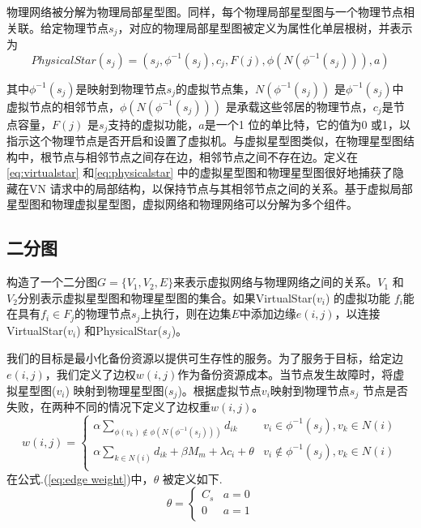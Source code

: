 物理网络被分解为物理局部星型图。同样，每个物理局部星型图与一个物理节点相关联。给定物理节点$s_j$，对应的物理局部星型图被定义为属性化单层根树，并表示为
\begin{equation}
PhysicalStar(s_j)=(s_j, \phi^{-1}( s_j), c_j, F(j), \phi(N(\phi^{-1}( s_j))), a)
\label{eq:physicalstar}
\end{equation}

其中$\phi^{-1}( s_j)$是映射到物理节点$s_j$的虚拟节点集，$N(\phi^{-1}( s_j))$ 是$\phi^{-1}( s_j)$中虚拟节点的相邻节点，$\phi(N(\phi^{-1}( s_j)))$ 是承载这些邻居的物理节点，$c_j$是节点容量，$F(j)$ 是$s_j$支持的虚拟功能，$a$是一个1 位的单比特，它的值为0 或1，以指示这个物理节点是否开启和设置了虚拟机。与虚拟星型图类似，在物理星型图结构中，根节点与相邻节点之间存在边，相邻节点之间不存在边。定义在\ref{eq:virtualstar} 和\ref{eq:physicalstar} 中的虚拟星型图和物理星型图很好地捕获了隐藏在VN 请求中的局部结构，以保持节点与其相邻节点之间的关系。基于虚拟局部星型图和物理虚拟星型图，虚拟网络和物理网络可以分解为多个组件。

\subsection{二分图}
构造了一个二分图$G=\{V_1,V_2,E\}$来表示虚拟网络与物理网络之间的关系。$V_1$ 和$V_2$分别表示虚拟星型图和物理星型图的集合。如果VirtualStar($v_i$) 的虚拟功能 $f_i$能在具有${f_i} \in {F_j}$的物理节点$s_j$上执行，则在边集$E$中添加边缘$e(i,j)$，以连接VirtualStar($v_i$) 和PhysicalStar($s_j$)。

我们的目标是最小化备份资源以提供可生存性的服务。为了服务于目标，给定边$e(i,j)$，我们定义了边权$w(i,j)$作为备份资源成本。当节点发生故障时，将虚拟星型图($v_i$) 映射到物理星型图($s_j$)。根据虚拟节点$v_i$映射到物理节点$s_j$ 节点是否失败，在两种不同的情况下定义了边权重$w(i,j)$。
\begin{equation}
w(i,j) = \left\{ {\begin{array}{*{20}{c}}
   { \alpha \sum\limits_{\phi ({v_k}) \notin \phi (N({\phi ^{ - 1}}({s_j})))} {{d_{ik}}} } & {{v_i} \in {\phi ^{ - 1}}({s_j}),v_k \in N(i)}  \\
   {\alpha \sum\limits_{k \in N(i)} {{d_{ik}}}  + \beta {M_m} + \lambda {c_i} + \theta } & {{v_i} \notin {\phi ^{ - 1}}({s_j}),v_k \in N(i)}  \\
\end{array}} \right.
\label{eq:edge weight}
\end{equation}
在公式.(\ref{eq:edge weight})中，$\theta$ 被定义如下.
\begin{equation}
\theta  = \left\{ {\begin{array}{*{20}{c}}
   {{C_s}} & {a = 0}  \\
   0 & {a = 1}  \\
\end{array}} \right.
\end{equation}

